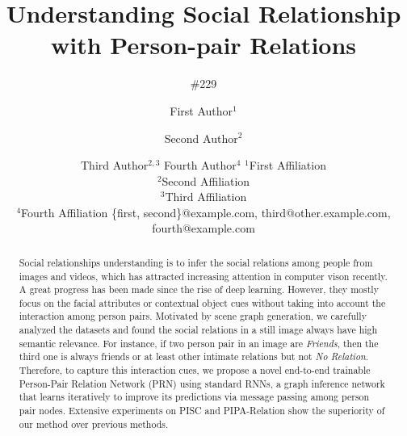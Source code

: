 \documentclass{article}
\title{Understanding Social Relationship with Person-pair Relations}
\author{
    \#229
}
\author{
First Author$^1$
\and
Second Author$^2$\and
Third Author$^{2,3}$\And
Fourth Author$^4$
\affiliations
$^1$First Affiliation\\
$^2$Second Affiliation\\
$^3$Third Affiliation\\
$^4$Fourth Affiliation
\emails
\{first, second\}@example.com,
third@other.example.com,
fourth@example.com
}
\newcommand{\PRN}{{\sf PRN}}
\begin{document}
\maketitle

\begin{abstract}

Social relationships understanding is to infer the social relations among people from images and videos, which has attracted increasing attention in computer vison recently. A great progress has been made since the rise of deep learning. However, they mostly focus on the facial attributes or contextual object cues without taking into account the interaction among person pairs. Motivated by scene graph generation, we carefully analyzed the datasets and found the social relations in a still image always have high semantic relevance. For instance, if two person pair in an image are {\it Friends}, then the third one is always friends or at least other intimate relations but not {\it No Relation}. Therefore, to capture this interaction cues, we propose a novel end-to-end trainable Person-Pair Relation Network (\PRN) using standard RNNs, a graph inference network that learns iteratively to improve its predictions via message passing among person pair nodes. Extensive experiments on PISC and PIPA-Relation show the superiority of our method over previous methods. 

\end{abstract}
\end{document}
